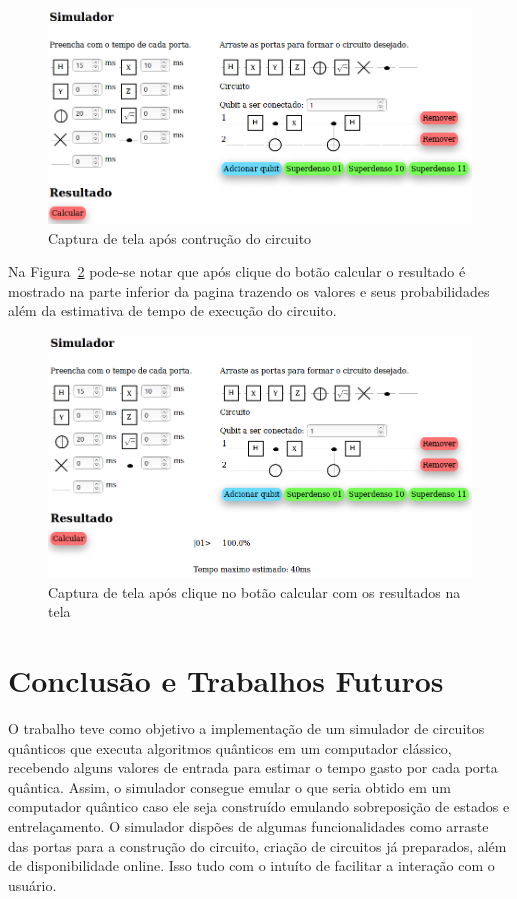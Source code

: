 \documentclass[a4paper, 12pt, oneside]{book}
\begin{document}
\begin{figure}[H]
\centering
\includegraphics[scale=0.45]{step03.png}
\caption{Captura de tela após contrução do circuito}
\label{fig:step03}
\end{figure}

Na Figura~\ref{fig:step04} pode-se notar que após clique do botão calcular o resultado é mostrado na parte inferior da pagina trazendo os valores e seus probabilidades além da estimativa de tempo de execução do circuito.

\begin{figure}[H]
\centering
\includegraphics[scale=0.45]{step04.png}
\caption{Captura de tela após clique no botão calcular com os resultados na tela}
\label{fig:step04}
\end{figure}

\chapter{Conclusão e Trabalhos Futuros}
\thispagestyle{empty} 

O trabalho teve como objetivo a implementação de um simulador de circuitos quânticos que executa algoritmos quânticos em um computador clássico, recebendo alguns valores de entrada para estimar o tempo gasto por cada porta quântica. Assim, o simulador consegue emular o que seria obtido em um computador quântico caso ele seja construído emulando sobreposição de estados e entrelaçamento. O simulador dispões de algumas funcionalidades como arraste das portas para a construção do circuito, criação de circuitos já preparados, além de disponibilidade online. Isso tudo com o intuíto de facilitar a interação com o usuário.
\end{document}

